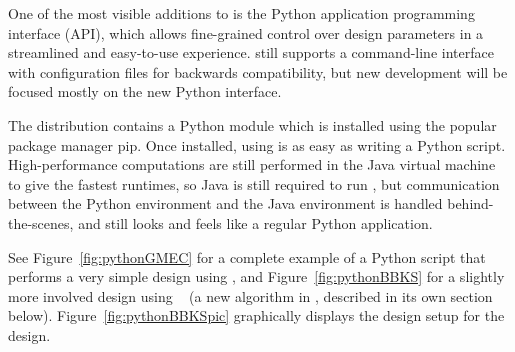 
One of the most visible additions to  is the Python application programming interface (API), which allows fine-grained control over design parameters in a streamlined and easy-to-use experience.  still supports a command-line interface with configuration files for backwards compatibility, but new development will be focused mostly on the new Python interface. %

The  distribution contains a Python module which is installed using the popular package manager {\sc pip}. Once installed, using  is as easy as writing a Python script. High-performance computations are still performed in the Java virtual machine to give the fastest runtimes, so Java is still required to run , but communication between the Python environment and the Java environment is handled behind-the-scenes, and  still looks and feels like a regular Python application.

See Figure~\ref{fig:pythonGMEC} for a complete example of a Python script that performs a very simple design using , and Figure~\ref{fig:pythonBBKS} for a slightly more involved design using \bbks~\cite{BBK*} (a new algorithm in , described in its own section below).  Figure~\ref{fig:pythonBBKSpic} graphically displays the design setup for the \bbks design.  
